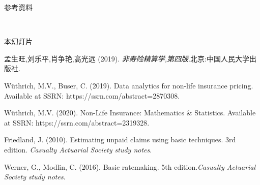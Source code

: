 \documentclass[professionalfont]{beamer}
\begin{document}
\begin{frame}{参考资料}

~

{\small
	\begin{thebibliography}{99}
		本幻灯片
		
		孟生旺,刘乐平,肖争艳,高光远 (2019).
		{\it 非寿险精算学,第四版}.北京:中国人民大学出版社.
		
		
		
		
		
		
		
		
		W\"uthrich, M.V., Buser, C. (2019).
		Data analytics for non-life insurance pricing.
		Available at SSRN: https://ssrn.com/abstract=2870308.
		
		W\"uthrich, M.V. (2020). Non-Life Insurance: Mathematics \& Statistics. Available at SSRN: https://ssrn.com/abstract=2319328.
		
		Friedland, J. (2010). Estimating unpaid claims using basic techniques. 3rd edition. {\it Casualty Actuarial Society study notes}.
		
		Werner, G., Modlin, C. (2016). Basic ratemaking. 5th edition.{\it Casualty Actuarial Society study notes}.
	\end{thebibliography}}
\end{frame}
\end{document}
